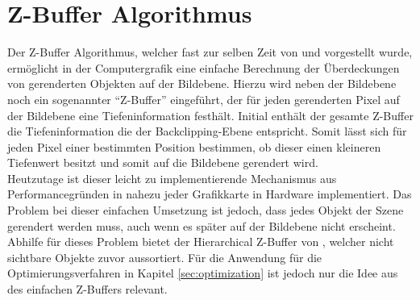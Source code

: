 
\section{Z-Buffer Algorithmus}

Der Z-Buffer Algorithmus, welcher fast zur selben Zeit von \citet{straber1974schnelle} und \citet{catmull1974subdivision} vorgestellt wurde, ermöglicht in der Computergrafik eine einfache Berechnung der Überdeckungen von gerenderten Objekten auf der Bildebene. Hierzu wird neben der Bildebene noch ein sogenannter \enquote{Z-Buffer} eingeführt, der für jeden gerenderten Pixel auf der Bildebene eine Tiefeninformation festhält. Initial enthält der gesamte Z-Buffer die Tiefeninformation die der Backclipping-Ebene entspricht. Somit lässt sich für jeden Pixel einer bestimmten Position bestimmen, ob dieser einen kleineren Tiefenwert besitzt und somit auf die Bildebene gerendert wird. \\

Heutzutage ist dieser leicht zu implementierende Mechanismus aus Performancegründen in nahezu jeder Grafikkarte in Hardware implementiert. Das Problem bei dieser einfachen Umsetzung ist jedoch, dass jedes Objekt der Szene gerendert werden muss, auch wenn es später auf der Bildebene nicht erscheint. Abhilfe für dieses Problem bietet der Hierarchical Z-Buffer von \citet{greene1993hierarchical}, welcher nicht sichtbare Objekte zuvor aussortiert. Für die Anwendung für die Optimierungsverfahren in Kapitel \ref{sec:optimization} ist jedoch nur die Idee aus des einfachen Z-Buffers relevant.